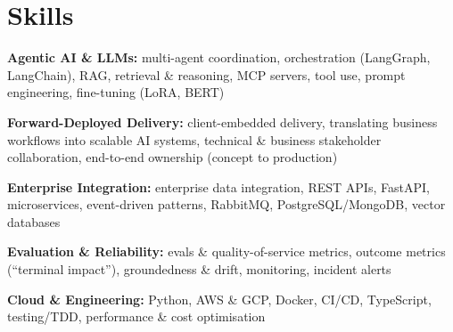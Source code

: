 \documentclass[10pt,a4paper]{article}
\begin{document}
\section{Skills}
\begin{tight}
  \item[\textcolor{accent}{\small$\bullet$}] \textbf{Agentic AI \& LLMs:} multi-agent coordination, orchestration (LangGraph, LangChain), RAG, retrieval \& reasoning, MCP servers, tool use, prompt engineering, fine-tuning (LoRA, BERT)
  \item[\textcolor{accent}{\small$\bullet$}] \textbf{Forward-Deployed Delivery:} client-embedded delivery, translating business workflows into scalable AI systems, technical \& business stakeholder collaboration, end-to-end ownership (concept to production)
  \item[\textcolor{accent}{\small$\bullet$}] \textbf{Enterprise Integration:} enterprise data integration, REST APIs, FastAPI, microservices, event-driven patterns, RabbitMQ, PostgreSQL/MongoDB, vector databases
  \item[\textcolor{accent}{\small$\bullet$}] \textbf{Evaluation \& Reliability:} evals \& quality-of-service metrics, outcome metrics (``terminal impact''), groundedness \& drift, monitoring, incident alerts
  \item[\textcolor{accent}{\small$\bullet$}] \textbf{Cloud \& Engineering:} Python, AWS \& GCP, Docker, CI/CD, TypeScript, testing/TDD, performance \& cost optimisation
\end{tight}

\end{document}
